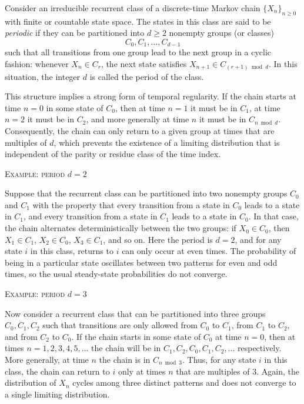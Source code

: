 Consider an irreducible recurrent class of a discrete-time Markov chain \(\{X_n\}_{n \ge 0}\) with finite or countable state space.
The states in this class are said to be \textit{periodic} if they can be partitioned into \(d \ge 2\) nonempty groups (or classes)
\[
C_0, C_1, \dots, C_{d-1}
\]
such that all transitions from one group lead to the next group in a cyclic fashion:
whenever \(X_n \in C_r\), the next state satisfies \(X_{n+1} \in C_{(r+1) \bmod d}\).
In this situation, the integer \(d\) is called the period of the class.

This structure implies a strong form of temporal regularity.
If the chain starts at time \(n = 0\) in some state of \(C_0\), then at time \(n = 1\) it must be in \(C_1\), at time \(n = 2\) it must be in \(C_2\), and more generally at time \(n\) it must be in \(C_{n \bmod d}\).
Consequently, the chain can only return to a given group at times that are multiples of \(d\), which prevents the existence of a limiting distribution that is independent of the parity or residue class of the time index.

\bigskip
\textsc{Example: period \(d = 2\)}

Suppose that the recurrent class can be partitioned into two nonempty groups \(C_0\) and \(C_1\) with the property that every transition from a state in \(C_0\) leads to a state in \(C_1\), and every transition from a state in \(C_1\) leads to a state in \(C_0\).
In that case, the chain alternates deterministically between the two groups:
if \(X_0 \in C_0\), then \(X_1 \in C_1\), \(X_2 \in C_0\), \(X_3 \in C_1\), and so on.
Here the period is \(d = 2\), and for any state \(i\) in this class, returns to \(i\) can only occur at even times.
The probability of being in a particular state oscillates between two patterns for even and odd times, so the usual steady-state probabilities do not converge.

\bigskip
\textsc{Example: period \(d = 3\)}

Now consider a recurrent class that can be partitioned into three groups \(C_0, C_1, C_2\) such that transitions are only allowed from \(C_0\) to \(C_1\), from \(C_1\) to \(C_2\), and from \(C_2\) to \(C_0\).
If the chain starts in some state of \(C_0\) at time \(n = 0\), then at times \(n = 1, 2, 3, 4, 5, \dots\) the chain will be in \(C_1, C_2, C_0, C_1, C_2, \dots\) respectively.
More generally, at time \(n\) the chain is in \(C_{n \bmod 3}\).
Thus, for any state \(i\) in this class, the chain can return to \(i\) only at times \(n\) that are multiples of \(3\).
Again, the distribution of \(X_n\) cycles among three distinct patterns and does not converge to a single limiting distribution.

